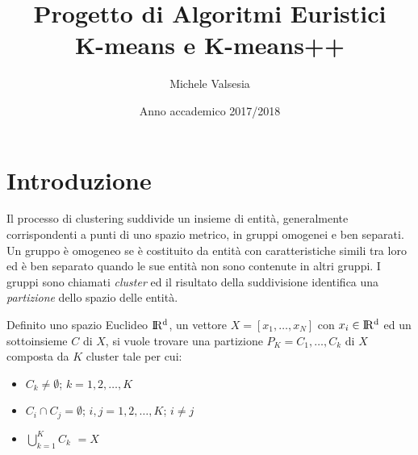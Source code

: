 \documentclass[12pt,a4paper,oneside,hidelinks]{report}
\begin{document}

\title{%
  Progetto di Algoritmi Euristici \\
  K-means e K-means++}
  
\author{Michele Valsesia}

\date{Anno accademico 2017/2018} 

\maketitle



\section*{Introduzione}
Il processo di clustering suddivide un insieme di entità, generalmente corrispondenti a punti di uno spazio metrico, in gruppi omogenei e ben separati. Un gruppo è omogeneo se è costituito da entità con caratteristiche simili tra loro ed è ben separato quando le sue entità non sono contenute in altri gruppi. I gruppi sono chiamati \textit{cluster} ed il risultato della suddivisione identifica una \textit{partizione} dello spazio delle entità.

Definito uno spazio Euclideo $\rm I\!R^d$, un vettore $X = {[x_1, \dotsc ,x_N]}$ con $x_i \in \rm I\!R^d$ ed un sottoinsieme $C$ di $X$, si vuole trovare una partizione $P_K = {C_1, \dotsc ,C_k}$ di $X$ composta da $K$ cluster tale per cui:

\begin{itemize}
\item $C_k \neq \emptyset$; $k = 1,2, \dotsc ,K$
\item $C_i \cap C_j = \emptyset$; $i,j = 1,2, \dotsc ,K$; $i \neq j$ 
\item $\displaystyle\bigcup_{k=1}^{K} C_k$ $ = X$
\end{itemize}
\end{document}
